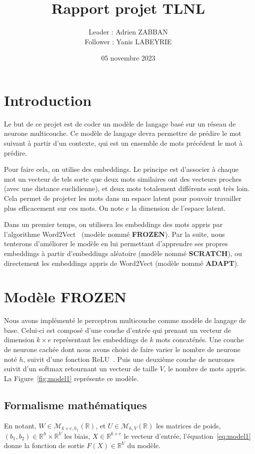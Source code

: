 \documentclass[a4paper]{article}
\title{Rapport projet TLNL}
\author{Leader : Adrien ZABBAN \\ Follower : Yanis LABEYRIE}
\date{05 novembre 2023}
\begin{document}
\maketitle


\section{Introduction}

Le but de ce projet est de coder un modèle de langage basé sur un réseau de neurone multicouche. Ce modèle de langage devra permettre de prédire le mot suivant à partir d'un contexte, qui est un ensemble de mots précédent le mot à prédire. 

Pour faire cela, on utilise des embeddings. Le principe est d'associer à chaque mot un vecteur de tels sorte que deux mots similaires ont des vecteurs proches (avec une distance euclidienne), et deux mots totalement différents sont très loin. Cela permet de projeter les mots dans un espace latent pour pouvoir travailler plus efficacement sur ces mots. On note $e$ la dimension de l'espace latent.

Dans un premier temps, on utilisera les embeddings des mots appris par l'algorithme Word2Vect~\cite{mikolov2013efficient} (modèle nommé \textbf{FROZEN}). Par la suite, nous tenterons d'améliorer le modèle en lui permettant d'apprendre ses propres embeddings à partir d'embeddings aléatoire (modèle nommé \textbf{SCRATCH}), ou directement les embeddings appris de Word2Vect (modèle nommé \textbf{ADAPT}).


\section{Modèle \textbf{FROZEN}}

Nous avons implémenté le perceptron multicouche comme modèle de langage de base. Celui-ci est composé d'une couche d'entrée qui prenant un vecteur de dimension $k \times e$ représentant les embeddings de $k$ mots concaténés. Une couche de neurone cachée dont nous avons choisi de faire varier le nombre de neurone noté $h$, suivit d'une fonction ReLU~\cite{DBLP:journals/corr/abs-1803-08375}. 
Puis une deuxième couche de neurones suivit d'un softmax retournant un vecteur de taille $V$, le nombre de mots appris. La Figure~\ref{fig:model1} représente ce modèle.

\subsection{Formalisme mathématiques}
En notant, $W \in \mathcal{M}_{k \times e, h_1}(\mathbb{R})$, et $U \in \mathcal{M}_{h, V}(\mathbb{R})$ les matrices de poids, $(b_1,b_2) \in \mathbb{R}^{h} \times \mathbb{R}^{V}$ les biais, $X \in \mathbb{R}^{k \times e}$ le vecteur d'entrée, l'équation~\eqref{eq:model1} donne la fonction de sortie $F(X) \in \mathbb{R}^{V}$ du modèle. 
\end{document}
